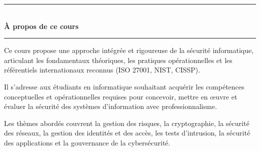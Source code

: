 \documentclass[12pt, a4paper, twoside, openright]{book}
\begin{document}




\backmatter

\clearpage
\printbibliography[
    heading=bibintoc,
    title={Bibliographie et Références}
]

\clearpage


\clearpage
\printindex
{}

\clearpage
\thispagestyle{empty}
\pagecolor{CouleurPrimaire}


\vspace*{2.5cm}

\begin{center}
    {\color{CouleurAccent}\rule{0.6\linewidth}{1pt}}\\[1.5ex]
    {\color{white}\Large\bfseries À propos de ce cours}\\[1.5ex]
    {\color{CouleurAccent}\rule{0.6\linewidth}{1pt}}
\end{center}

\vspace{1cm}

\begin{center}
\begin{minipage}{0.75\textwidth}
\color{white!85!gray}
Ce cours propose une approche intégrée et rigoureuse de la sécurité informatique, articulant les fondamentaux théoriques, les pratiques opérationnelles et les référentiels internationaux reconnus (ISO 27001, NIST, CISSP).

\medskip

Il s'adresse aux étudiants en informatique souhaitant acquérir les compétences conceptuelles et opérationnelles requises pour concevoir, mettre en œuvre et évaluer la sécurité des systèmes d'information avec professionnalisme.

\medskip

Les thèmes abordés couvrent la gestion des risques, la cryptographie, la sécurité des réseaux, la gestion des identités et des accès, les tests d'intrusion, la sécurité des applications et la gouvernance de la cybersécurité.
\end{minipage}
\end{center}
\end{document}
